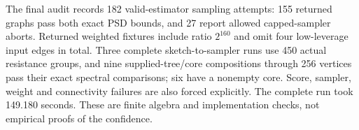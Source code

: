 The final audit records 182 valid-estimator sampling attempts: 155 returned
graphs pass both exact PSD bounds, and 27 report allowed capped-sampler
aborts. Returned weighted fixtures include ratio $2^{160}$ and omit four
low-leverage input edges in total. Three complete sketch-to-sampler runs
use 450 actual resistance groups, and nine supplied-tree/core compositions
through 256 vertices pass their exact spectral comparisons; six have a
nonempty core. Score, sampler, weight and connectivity failures are also
forced explicitly. The complete run took 149.180 seconds. These are finite
algebra and implementation checks, not empirical proofs of the confidence.
